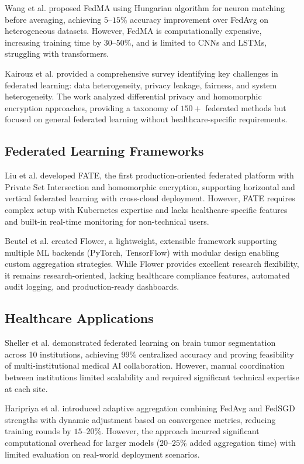 \documentclass[conference]{IEEEtran}
\begin{document}
Wang et al. \cite{wang2020federated} proposed FedMA using Hungarian algorithm for neuron matching before averaging, achieving $5$--$15\%$ accuracy improvement over FedAvg on heterogeneous datasets. However, FedMA is computationally expensive, increasing training time by $30$--$50\%$, and is limited to CNNs and LSTMs, struggling with transformers.

Kairouz et al. \cite{kairouz2021advances} provided a comprehensive survey identifying key challenges in federated learning: data heterogeneity, privacy leakage, fairness, and system heterogeneity. The work analyzed differential privacy and homomorphic encryption approaches, providing a taxonomy of $150+$ federated methods but focused on general federated learning without healthcare-specific requirements.

\subsection{Federated Learning Frameworks}
Liu et al. \cite{liu2021fate} developed FATE, the first production-oriented federated platform with Private Set Intersection and homomorphic encryption, supporting horizontal and vertical federated learning with cross-cloud deployment. However, FATE requires complex setup with Kubernetes expertise and lacks healthcare-specific features and built-in real-time monitoring for non-technical users.

Beutel et al. \cite{beutel2020flower} created Flower, a lightweight, extensible framework supporting multiple ML backends (PyTorch, TensorFlow) with modular design enabling custom aggregation strategies. While Flower provides excellent research flexibility, it remains research-oriented, lacking healthcare compliance features, automated audit logging, and production-ready dashboards.

\subsection{Healthcare Applications}
Sheller et al. \cite{sheller2020federated} demonstrated federated learning on brain tumor segmentation across 10 institutions, achieving $99\%$ centralized accuracy and proving feasibility of multi-institutional medical AI collaboration. However, manual coordination between institutions limited scalability and required significant technical expertise at each site.

Haripriya et al. \cite{haripriya2025privacy} introduced adaptive aggregation combining FedAvg and FedSGD strengths with dynamic adjustment based on convergence metrics, reducing training rounds by $15$--$20\%$. However, the approach incurred significant computational overhead for larger models ($20$--$25\%$ added aggregation time) with limited evaluation on real-world deployment scenarios.
\end{document}
